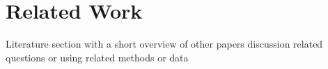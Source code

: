 \section{Related Work}

Literature section with a short overview of other papers discussion related questions or using related methods or data